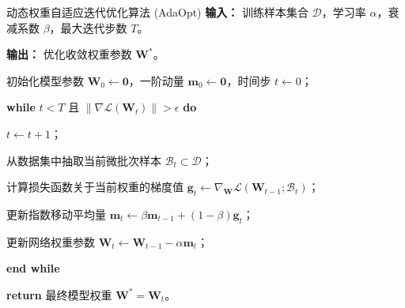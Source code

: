 

\begin{thesisalgorithm}{动态权重自适应迭代优化算法 (AdaOpt)}
  \label{alg:adaopt}
  \textbf{输入：} 训练样本集合 $\mathcal{D}$，学习率 $\alpha$，衰减系数 $\beta$，最大迭代步数 $T$。

  \textbf{输出：} 优化收敛权重参数 $\mathbf{W}^*$。
  \begin{algorithmsteps}
    \item 初始化模型参数 $\mathbf{W}_0 \leftarrow \mathbf{0}$，一阶动量 $\mathbf{m}_0 \leftarrow \mathbf{0}$，时间步 $t \leftarrow 0$；
    \item \textbf{while} $t < T$ 且 $\|\nabla \mathcal{L}(\mathbf{W}_t)\| > \epsilon$ \textbf{do}
    \item \quad $t \leftarrow t + 1$；
    \item \quad 从数据集中抽取当前微批次样本 $\mathcal{B}_t \subset \mathcal{D}$；
    \item \quad 计算损失函数关于当前权重的梯度值 $\mathbf{g}_t \leftarrow \nabla_{\mathbf{W}}\mathcal{L}(\mathbf{W}_{t-1}; \mathcal{B}_t)$；
    \item \quad 更新指数移动平均量 $\mathbf{m}_t \leftarrow \beta \mathbf{m}_{t-1} + (1 - \beta) \mathbf{g}_t$；
    \item \quad 更新网络权重参数 $\mathbf{W}_t \leftarrow \mathbf{W}_{t-1} - \alpha \mathbf{m}_t$；
    \item \textbf{end while}
    \item \textbf{return} 最终模型权重 $\mathbf{W}^* = \mathbf{W}_t$。
  \end{algorithmsteps}
\end{thesisalgorithm}
